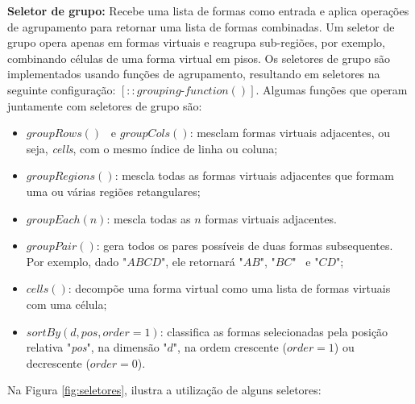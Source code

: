 \textbf{Seletor de grupo:} Recebe uma lista de formas como entrada e aplica operações de agrupamento para retornar uma lista de formas combinadas. Um seletor de grupo opera apenas em formas virtuais e reagrupa sub-regiões, por exemplo, combinando células de uma forma virtual em pisos. Os seletores de grupo são implementados usando funções de agrupamento, resultando em seletores na seguinte configuração: $[::grouping\mbox{-}function()]$. Algumas funções que operam juntamente com seletores de grupo são:

\begin{itemize}
    \item $groupRows()$ \, e $groupCols()$: mesclam formas virtuais adjacentes, ou seja, \textit{cells}, com o mesmo índice de linha ou coluna;
    
    \item $groupRegions()$: mescla todas as formas virtuais adjacentes que formam uma ou várias regiões retangulares;
    
    \item $groupEach(n)$: mescla todas as $n$ formas virtuais adjacentes.
    
    \item $groupPair()$: gera todos os pares possíveis de duas formas subsequentes. Por exemplo, dado "$ABCD$", ele retornará "$AB$", "$BC$" \, e "$CD$";
    
    \item $cells()$: decompõe uma forma virtual como uma lista de formas virtuais com uma célula;
    
    \item $sortBy(d, pos, order=1)$: classifica as formas selecionadas pela posição relativa "\textit{pos}", na dimensão "$d$", na ordem crescente ($order=1$) ou decrescente ($order=0$).
\end{itemize}

\vspace{0.5cm}

Na Figura \ref{fig:seletores},  ilustra a utilização de alguns seletores:

\vspace{0.5cm}

